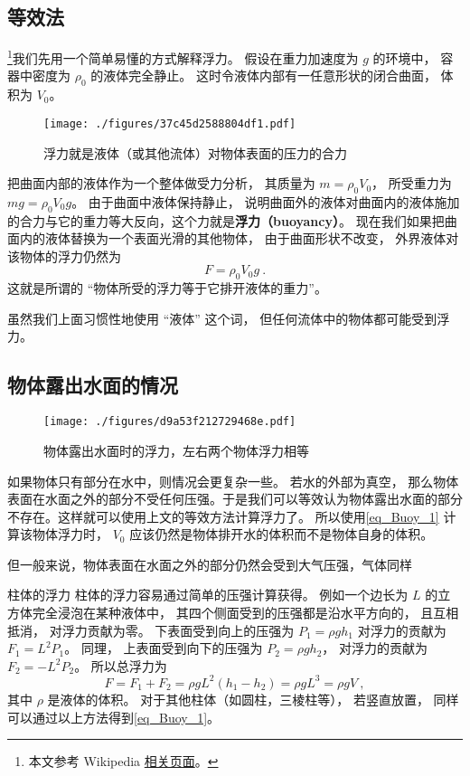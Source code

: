 

\subsection{等效法}

\footnote{本文参考 Wikipedia \href{https://en.wikipedia.org/wiki/Archimedes'_principle}{相关页面}。}我们先用一个简单易懂的方式解释浮力。 假设在重力加速度为 $g$ 的环境中， 容器中密度为 $\rho_0$ 的液体完全静止。 这时令液体内部有一任意形状的闭合曲面， 体积为 $V_0$。
\begin{figure}[ht]
\centering
\texttt{[image: ./figures/37c45d2588804df1.pdf]}
\caption{浮力就是液体（或其他流体）对物体表面的压力的合力} \label{fig_Buoy_1}
\end{figure}
把曲面内部的液体作为一个整体做受力分析， 其质量为 $m = \rho_0 V_0$， 所受重力为 $mg = \rho_0 V_0 g$。 由于曲面中液体保持静止， 说明曲面外的液体对曲面内的液体施加的合力与它的重力等大反向，这个力就是\textbf{浮力（buoyancy）}。 现在我们如果把曲面内的液体替换为一个表面光滑的其他物体， 由于曲面形状不改变， 外界液体对该物体的浮力仍然为
\begin{equation}\label{eq_Buoy_1}
F = \rho_0 V_0 g~.
\end{equation}
这就是所谓的 “物体所受的浮力等于它排开液体的重力”。

虽然我们上面习惯性地使用 “液体” 这个词， 但任何流体中的物体都可能受到浮力。

\subsection{物体露出水面的情况}
\begin{figure}[ht]
\centering
\texttt{[image: ./figures/d9a53f212729468e.pdf]}
\caption{物体露出水面时的浮力，左右两个物体浮力相等} \label{fig_Buoy_2}
\end{figure}
如果物体只有部分在水中，则情况会更复杂一些。 若水的外部为真空， 那么物体表面在水面之外的部分不受任何压强。于是我们可以等效认为物体露出水面的部分不存在。这样就可以使用上文的等效方法计算浮力了。 所以使用\autoref{eq_Buoy_1} 计算该物体浮力时， $V_0$ 应该仍然是物体排开水的体积而不是物体自身的体积。


但一般来说，物体表面在水面之外的部分仍然会受到大气压强，气体同样

\begin{example}{柱体的浮力}
柱体的浮力容易通过简单的压强计算获得。 例如一个边长为 $L$ 的立方体完全浸泡在某种液体中， 其四个侧面受到的压强都是沿水平方向的， 且互相抵消， 对浮力贡献为零。 下表面受到向上的压强为 $P_1 = \rho g h_1$ 对浮力的贡献为 $F_1 = L^2 P_1$。 同理， 上表面受到向下的压强为 $P_2 = \rho g h_2$， 对浮力的贡献为 $F_2 = -L^2 P_2$。 所以总浮力为
\begin{equation}
F = F_1 + F_2 = \rho g L^2 (h_1 - h_2) = \rho g L^3 = \rho g V~,
\end{equation}
其中 $\rho$ 是液体的体积。 对于其他柱体（如圆柱，三棱柱等）， 若竖直放置， 同样可以通过以上方法得到\autoref{eq_Buoy_1}。
\end{example}

